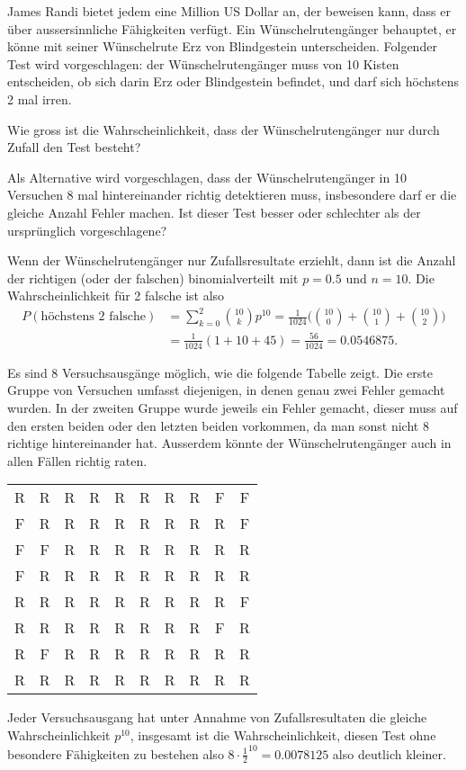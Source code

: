 James Randi bietet jedem eine Million US Dollar an, der beweisen kann,
dass er über aussersinnliche Fähigkeiten verfügt. Ein Wünschelrutengänger
behauptet, er könne mit seiner Wünschelrute Erz von Blindgestein
unterscheiden. Folgender Test wird vorgeschlagen: der Wünschelrutengänger
muss von 10 Kisten entscheiden, ob sich darin Erz oder Blindgestein
befindet, und darf sich höchstens 2 mal irren.
\begin{teilaufgaben}
\item
Wie gross ist die
Wahrscheinlichkeit, dass der Wünschelrutengänger nur durch Zufall
den Test besteht?
\item
Als Alternative wird vorgeschlagen, dass der Wünschelrutengänger
in 10 Versuchen
8 mal hintereinander richtig detektieren muss, insbesondere darf
er die gleiche Anzahl Fehler machen.
Ist dieser Test
besser oder schlechter als der ursprünglich vorgeschlagene?
\end{teilaufgaben}

\begin{loesung}
\begin{teilaufgaben}
\item Wenn der Wünschelrutengänger nur Zufallsresultate erziehlt,
dann ist die Anzahl der richtigen (oder der falschen) binomialverteilt
mit $p=0.5$ und $n=10$. Die Wahrscheinlichkeit für 2 falsche ist also
\begin{align*}
P(\text{höchstens 2 falsche})&=\sum_{k=0}^2 \binom{10}{k}p^{10}
=
\frac1{1024}\biggl(
\binom{10}{0}
+
\binom{10}{1}
+
\binom{10}{2}
\biggr)
\\
&=
\frac1{1024}( 1 + 10 + 45)
=\frac{56}{1024}=0.0546875.
\end{align*}
\item Es sind 8 Versuchsausgänge möglich, wie die folgende Tabelle
zeigt. Die erste Gruppe von Versuchen umfasst diejenigen, in denen
genau zwei Fehler gemacht wurden. In der zweiten Gruppe wurde jeweils
ein Fehler gemacht, dieser muss auf den ersten beiden oder den letzten
beiden vorkommen, da man sonst nicht 8 richtige hintereinander hat.
Ausserdem könnte der Wünschelrutengänger auch in allen Fällen richtig
raten.
\begin{center}
\begin{tabular}{cccccccccc}
R&R&R&R&R&R&R&R&F&F\\
F&R&R&R&R&R&R&R&R&F\\
F&F&R&R&R&R&R&R&R&R\\
\hline
F&R&R&R&R&R&R&R&R&R\\
R&R&R&R&R&R&R&R&R&F\\
R&R&R&R&R&R&R&R&F&R\\
R&F&R&R&R&R&R&R&R&R\\
\hline
R&R&R&R&R&R&R&R&R&R
\end{tabular}
\end{center}
Jeder Versuchsausgang hat unter Annahme von Zufallsresultaten die gleiche
Wahrscheinlichkeit
$p^{10}$, insgesamt ist die Wahrscheinlichkeit, diesen Test ohne
besondere Fähigkeiten zu bestehen also $8\cdot \frac12^{10}=0.0078125$
also deutlich kleiner.
\qedhere
\end{teilaufgaben}
\end{loesung}

